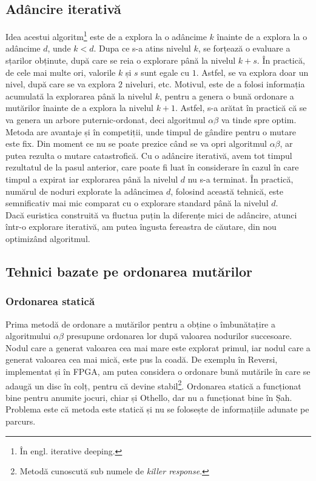 \documentclass[12pt,twoside,a4paper,fleqn]{book}
\theoremstyle{definition}
\begin{document}
\subsection{Adâncire iterativă}
Idea acestui algoritm\footnote{În engl. iterative deeping.} este de a explora la o adâncime $k$ înainte de a explora la o adâncime $d$, unde $k < d$. Dupa ce s-a atins nivelul $k$, se forțează o evaluare a sțarilor obținute, după care se reia o explorare până la nivelul $k+s$. În practică, de cele mai multe ori, valorile $k$ și $s$ sunt egale cu $1$. Astfel, se va explora doar un nivel, după care se va explora $2$ niveluri, etc. Motivul, este de a folosi informația acumulată la explorarea până la nivelul $k$, pentru a genera o bună ordonare a mutărilor înainte de a explora la nivelul $k+1$. Astfel, s-a arătat în practică \cite{brokington} că se va genera un arbore puternic-ordonat, deci algoritmul $\alpha \beta$ va tinde spre optim. Metoda are avantaje și în competiții, unde timpul de gândire pentru o mutare este fix. Din moment ce nu se poate prezice când se va opri algoritmul $\alpha \beta$, ar putea rezulta o mutare catastrofică. Cu o adâncire iterativă, avem tot timpul rezultatul de la pasul anterior, care poate fi luat în considerare în cazul în care timpul a expirat iar explorarea până la nivelul $d$ nu s-a terminat. În practică, numărul de noduri explorate la adâncimea $d$, folosind această tehnică, este semnificativ mai mic comparat cu o explorare standard până la nivelul $d$.\\
Dacă euristica construită va fluctua puțin la diferențe mici de adâncire, atunci într-o explorare iterativă, am putea îngusta fereastra de căutare, din nou optimizând algoritmul.
\subsection{Tehnici bazate pe ordonarea mutărilor}

\subsubsection{Ordonarea statică}
Prima metodă de ordonare a mutărilor pentru a obține o îmbunătațire a algoritmului $\alpha \beta$ presupune ordonarea lor după valoarea nodurilor succesoare. Nodul care a generat valoarea cea mai mare este explorat primul, iar nodul care a generat valoarea cea mai mică, este pus la coadă. De exemplu în Reversi, implementat și în FPGA, am putea considera o ordonare bună mutările în care se adaugă un disc în colț, pentru că devine stabil\footnote{Metodă cunoscută sub numele de \emph{killer response}.}. Ordonarea statică a funcționat bine \cite{brokington} pentru anumite jocuri, chiar și Othello, dar nu a funcționat bine în Șah. Problema este că metoda este statică și nu se folosește de informațiile adunate pe parcurs.
\end{document}
